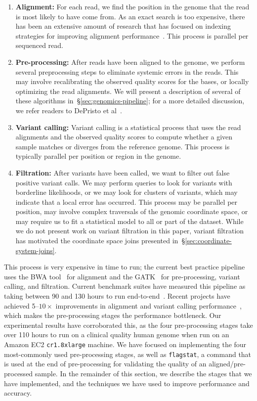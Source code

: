 \documentclass{acm_proc_article-sp}
\begin{document}
\begin{enumerate}
\item \textbf{Alignment:} For each read, we find the position in the genome that the read is most likely to
have come from. As an exact search is too expensive, there has been an extensive amount of research
that has focused on indexing strategies for improving alignment performance~\cite{li10, li11,
zaharia11}. This process is parallel per sequenced read.
\item \textbf{Pre-processing:} After reads have been aligned to the genome, we perform several
preprocessing steps to eliminate systemic errors in the reads. This may involve recalibrating the
observed quality scores for the bases, or locally optimizing the read alignments. We will present a
description of several of these algorithms in~\S\ref{sec:genomics-pipeline}; for a more detailed
discussion, we refer readers to DePristo et al~\cite{depristo11}.
\item \textbf{Variant calling:} Variant calling is a statistical process that uses the read alignments
and the observed quality scores to compute whether a given sample \linebreak matches or diverges
from the reference genome. This process is typically parallel per position or region in the genome.
\item \textbf{Filtration:} After variants have been called, we want to filter out false positive variant calls.
We may perform queries to look for variants with borderline likelihoods, or we may look for clusters of
variants, which may indicate that a local error has occurred. This process may be parallel per position,
may involve complex traversals of the genomic coordinate space, or may require us to fit a statistical
model to all or part of the dataset. While we do not present work on variant filtration in this paper, variant
filtration has motivated the coordinate space joins presented in~\S\ref{sec:coordinate-system-joins}.
\end{enumerate}

This process is very expensive in time to run; the current best practice pipeline uses the BWA tool~\cite{li10} for
alignment and the GATK~\cite{depristo11, mckenna10} for pre-processing, variant calling, and filtration.
Current benchmark suites have measured this pipeline as taking between 90 and 130 hours to run
end-to-end~\cite{talwalkar14}. Recent projects have achieved 5--$10\times$ improvements in alignment
and variant calling performance~\cite{rimmer14, zaharia11}, which makes the pre-processing stages
the performance bottleneck. Our experimental results have corroborated this, as the four pre-processing stages
take over 110 hours to run on a clinical quality human genome when run on an Amazon EC2 \texttt{cr1.8xlarge}
machine. We have focused on implementing the four most-commonly used pre-processing stages, as well as
\texttt{flagstat}, a command that is used at the end of pre-processing for validating the quality of an
aligned/pre-processed sample. In the remainder of this section, we describe the stages that we have implemented,
and the techniques we have used to improve performance and accuracy.
\end{document}

